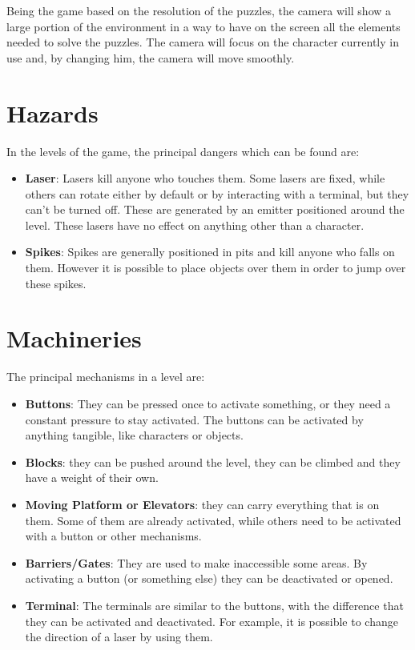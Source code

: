 \documentclass[12pt, a4paper]{report}
\begin{document}
Being the game based on the resolution of the puzzles, the camera will show a large portion of the environment in a way to have on the screen all the elements needed to solve the puzzles. The camera will focus on the character currently in use and, by changing him, the camera will move smoothly.

\section*{Hazards}
In the levels of the game, the principal dangers which can be found are:
\begin{itemize}
	\item \textbf{Laser}: Lasers kill anyone who touches them. Some lasers are fixed, while others can rotate either by default or by interacting with a 			terminal, but they can't be turned off. These are generated by an emitter positioned around the level. These lasers have no effect on anything other than a character.
	\item \textbf{Spikes}: Spikes are generally positioned in pits and kill anyone who falls on them. However it is possible to place objects over them in order to jump over these spikes.
\end{itemize}

\section*{Machineries}
The principal mechanisms in a level are:
\begin{itemize}
	\item \textbf{Buttons}: They can be pressed once to activate something, or they need a constant pressure to stay activated. The buttons can be activated 	by anything tangible, like characters or objects.
	\item \textbf{Blocks}: they can be pushed around the level, they can be climbed and they have a weight of their own.
	\item \textbf{Moving Platform or Elevators}: they can carry everything that is on them. Some of them are already activated, while others need to be 			activated with a button or other mechanisms.
	\item \textbf{Barriers/Gates}: They are used to make inaccessible some areas. By activating a button (or something else) they can be deactivated or 			opened.
	\item \textbf{Terminal}: The terminals are similar to the buttons, with the difference that they can be activated and deactivated. For example, it is 			possible to change the direction of a laser by using them.
\end{itemize}
\end{document}
